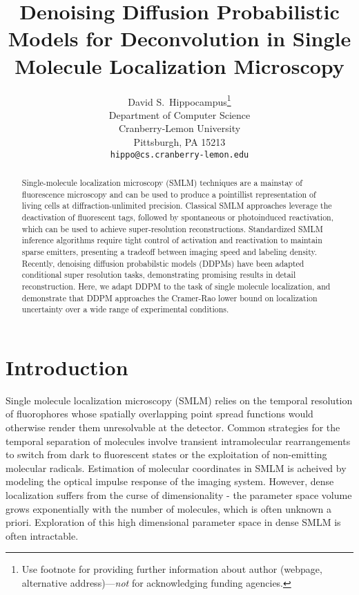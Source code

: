 \documentclass{article}
\title{Denoising Diffusion Probabilistic Models for Deconvolution in Single Molecule Localization Microscopy}
\author{%
  David S.~Hippocampus\thanks{Use footnote for providing further information
    about author (webpage, alternative address)---\emph{not} for acknowledging
    funding agencies.} \\
  Department of Computer Science\\
  Cranberry-Lemon University\\
  Pittsburgh, PA 15213 \\
  \texttt{hippo@cs.cranberry-lemon.edu} \\
}
\begin{document}
\maketitle


\begin{abstract}
Single-molecule localization microscopy (SMLM) techniques are a mainstay of fluorescence microscopy and can be used to produce a pointillist representation of living cells at diffraction-unlimited precision. Classical SMLM approaches leverage the deactivation of fluorescent tags, followed by spontaneous or photoinduced reactivation, which can be used to achieve super-resolution reconstructions. Standardized SMLM inference algorithms require tight control of activation and reactivation to maintain sparse emitters, presenting a tradeoff between imaging speed and labeling density. Recently, denoising diffusion probabilstic models (DDPMs) have been adapted conditional super resolution tasks, demonstrating promising results in detail reconstruction. Here, we adapt DDPM to the task of single molecule localization, and demonstrate that DDPM approaches the Cramer-Rao lower bound on localization uncertainty over a wide range of experimental conditions.
\end{abstract}

\section{Introduction}
Single molecule localization microscopy (SMLM) relies on the temporal resolution of fluorophores whose spatially overlapping point spread functions would otherwise render them unresolvable at the detector. Common strategies for the temporal separation of molecules involve transient intramolecular rearrangements to switch from dark to fluorescent states or the exploitation of non-emitting molecular radicals. Estimation of molecular coordinates in SMLM is acheived by modeling the optical impulse response of the imaging system. However, dense localization suffers from the curse of dimensionality - the parameter space volume grows exponentially with the number of molecules, which is often unknown a priori. Exploration of this high dimensional parameter space in dense SMLM is often intractable. 
\end{document}
